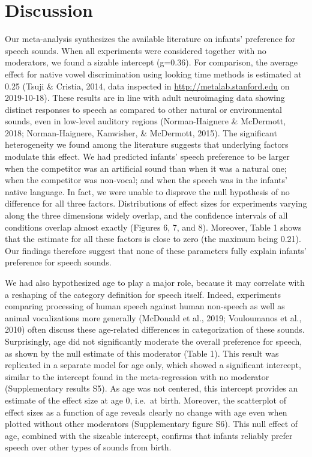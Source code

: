 \documentclass[man]{apa6}
\begin{document}
\section{Discussion}\label{discussion}

Our meta-analysis synthesizes the available literature on infants'
preference for speech sounds. When all experiments were considered
together with no moderators, we found a sizable intercept (g=0.36). For
comparison, the average effect for native vowel discrimination using
looking time methods is estimated at 0.25 (Tsuji \& Cristia, 2014, data
inspected in \url{http://metalab.stanford.edu} on 2019-10-18). These
results are in line with adult neuroimaging data showing distinct
responses to speech as compared to other natural or environmental
sounds, even in low-level auditory regions (Norman-Haignere \&
McDermott, 2018; Norman-Haignere, Kanwisher, \& McDermott, 2015). The
significant heterogeneity we found among the literature suggests that
underlying factors modulate this effect. We had predicted infants'
speech preference to be larger when the competitor was an artificial
sound than when it was a natural one; when the competitor was non-vocal;
and when the speech was in the infants' native language. In fact, we
were unable to disprove the null hypothesis of no difference for all
three factors. Distributions of effect sizes for experiments varying
along the three dimensions widely overlap, and the confidence intervals
of all conditions overlap almost exactly (Figures 6, 7, and 8).
Moreover, Table 1 shows that the estimate for all these factors is close
to zero (the maximum being 0.21). Our findings therefore suggest that
none of these parameters fully explain infants' preference for speech
sounds.

We had also hypothesized age to play a major role, because it may
correlate with a reshaping of the category definition for speech itself.
Indeed, experiments comparing processing of human speech against human
non-speech as well as animal vocalizations more generally (McDonald et
al., 2019; Vouloumanos et al., 2010) often discuss these age-related
differences in categorization of these sounds. Surprisingly, age did not
significantly moderate the overall preference for speech, as shown by
the null estimate of this moderator (Table 1). This result was
replicated in a separate model for age only, which showed a significant
intercept, similar to the intercept found in the meta-regression with no
moderator (Supplementary results S5). As age was not centered, this
intercept provides an estimate of the effect size at age 0, i.e.~at
birth. Moreover, the scatterplot of effect sizes as a function of age
reveals clearly no change with age even when plotted without other
moderators (Supplementary figure S6). This null effect of age, combined
with the sizeable intercept, confirms that infants reliably prefer
speech over other types of sounds from birth.
\end{document}
